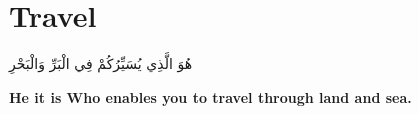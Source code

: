 \chapter{Travel}
\begin{center}
    {\Huge    
        \begin{Arabic}
            هُوَ الَّذِي يُسَيِّرُكُمْ فِي الْبَرِّ وَالْبَحْرِ
        \end{Arabic}
    }    
\end{center}
\vspace*{\fill}
\vspace{3cm}
\begin{center}
    \Large \textbf{He it is Who enables you to travel through land and sea.}
\end{center}

